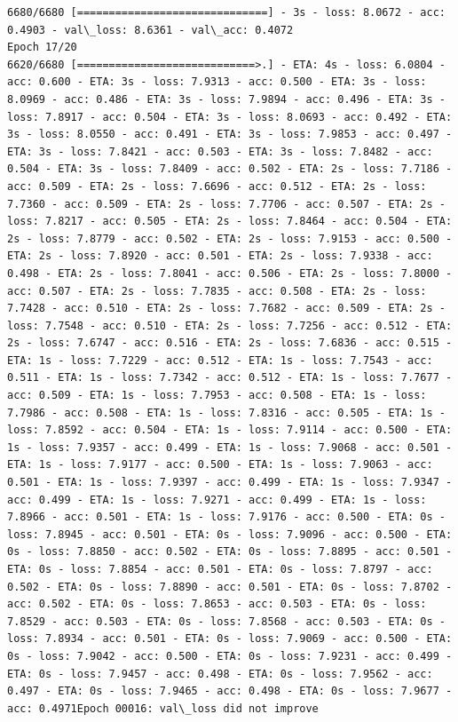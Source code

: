 \documentclass[11pt]{article}
\begin{document}
\begin{Verbatim}[commandchars=\\\{\}]
6680/6680 [==============================] - 3s - loss: 8.0672 - acc: 0.4903 - val\_loss: 8.6361 - val\_acc: 0.4072
Epoch 17/20
6620/6680 [============================>.] - ETA: 4s - loss: 6.0804 - acc: 0.600 - ETA: 3s - loss: 7.9313 - acc: 0.500 - ETA: 3s - loss: 8.0969 - acc: 0.486 - ETA: 3s - loss: 7.9894 - acc: 0.496 - ETA: 3s - loss: 7.8917 - acc: 0.504 - ETA: 3s - loss: 8.0693 - acc: 0.492 - ETA: 3s - loss: 8.0550 - acc: 0.491 - ETA: 3s - loss: 7.9853 - acc: 0.497 - ETA: 3s - loss: 7.8421 - acc: 0.503 - ETA: 3s - loss: 7.8482 - acc: 0.504 - ETA: 3s - loss: 7.8409 - acc: 0.502 - ETA: 2s - loss: 7.7186 - acc: 0.509 - ETA: 2s - loss: 7.6696 - acc: 0.512 - ETA: 2s - loss: 7.7360 - acc: 0.509 - ETA: 2s - loss: 7.7706 - acc: 0.507 - ETA: 2s - loss: 7.8217 - acc: 0.505 - ETA: 2s - loss: 7.8464 - acc: 0.504 - ETA: 2s - loss: 7.8779 - acc: 0.502 - ETA: 2s - loss: 7.9153 - acc: 0.500 - ETA: 2s - loss: 7.8920 - acc: 0.501 - ETA: 2s - loss: 7.9338 - acc: 0.498 - ETA: 2s - loss: 7.8041 - acc: 0.506 - ETA: 2s - loss: 7.8000 - acc: 0.507 - ETA: 2s - loss: 7.7835 - acc: 0.508 - ETA: 2s - loss: 7.7428 - acc: 0.510 - ETA: 2s - loss: 7.7682 - acc: 0.509 - ETA: 2s - loss: 7.7548 - acc: 0.510 - ETA: 2s - loss: 7.7256 - acc: 0.512 - ETA: 2s - loss: 7.6747 - acc: 0.516 - ETA: 2s - loss: 7.6836 - acc: 0.515 - ETA: 1s - loss: 7.7229 - acc: 0.512 - ETA: 1s - loss: 7.7543 - acc: 0.511 - ETA: 1s - loss: 7.7342 - acc: 0.512 - ETA: 1s - loss: 7.7677 - acc: 0.509 - ETA: 1s - loss: 7.7953 - acc: 0.508 - ETA: 1s - loss: 7.7986 - acc: 0.508 - ETA: 1s - loss: 7.8316 - acc: 0.505 - ETA: 1s - loss: 7.8592 - acc: 0.504 - ETA: 1s - loss: 7.9114 - acc: 0.500 - ETA: 1s - loss: 7.9357 - acc: 0.499 - ETA: 1s - loss: 7.9068 - acc: 0.501 - ETA: 1s - loss: 7.9177 - acc: 0.500 - ETA: 1s - loss: 7.9063 - acc: 0.501 - ETA: 1s - loss: 7.9397 - acc: 0.499 - ETA: 1s - loss: 7.9347 - acc: 0.499 - ETA: 1s - loss: 7.9271 - acc: 0.499 - ETA: 1s - loss: 7.8966 - acc: 0.501 - ETA: 1s - loss: 7.9176 - acc: 0.500 - ETA: 0s - loss: 7.8945 - acc: 0.501 - ETA: 0s - loss: 7.9096 - acc: 0.500 - ETA: 0s - loss: 7.8850 - acc: 0.502 - ETA: 0s - loss: 7.8895 - acc: 0.501 - ETA: 0s - loss: 7.8854 - acc: 0.501 - ETA: 0s - loss: 7.8797 - acc: 0.502 - ETA: 0s - loss: 7.8890 - acc: 0.501 - ETA: 0s - loss: 7.8702 - acc: 0.502 - ETA: 0s - loss: 7.8653 - acc: 0.503 - ETA: 0s - loss: 7.8529 - acc: 0.503 - ETA: 0s - loss: 7.8568 - acc: 0.503 - ETA: 0s - loss: 7.8934 - acc: 0.501 - ETA: 0s - loss: 7.9069 - acc: 0.500 - ETA: 0s - loss: 7.9042 - acc: 0.500 - ETA: 0s - loss: 7.9231 - acc: 0.499 - ETA: 0s - loss: 7.9457 - acc: 0.498 - ETA: 0s - loss: 7.9562 - acc: 0.497 - ETA: 0s - loss: 7.9465 - acc: 0.498 - ETA: 0s - loss: 7.9677 - acc: 0.4971Epoch 00016: val\_loss did not improve

\end{Verbatim}
\end{document}
